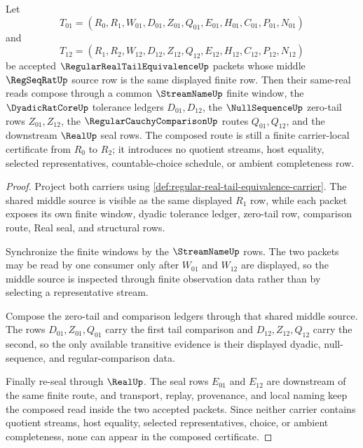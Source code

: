 \begin{theorem}
\label{thm:regular-real-tail-equivalence-transitive-window}
Let
$$
T_{01}=(R_0,R_1,W_{01},D_{01},Z_{01},Q_{01},E_{01},H_{01},C_{01},P_{01},N_{01})
$$
and
$$
T_{12}=(R_1,R_2,W_{12},D_{12},Z_{12},Q_{12},E_{12},H_{12},C_{12},P_{12},N_{12})
$$
be accepted $\RegularRealTailEquivalenceUp$ packets whose middle $\RegSeqRatUp$ source row is the same displayed finite row. Then their same-real reads compose through a common $\StreamNameUp$ finite window, the $\DyadicRatCoreUp$ tolerance ledgers $D_{01},D_{12}$, the $\NullSequenceUp$ zero-tail rows $Z_{01},Z_{12}$, the $\RegularCauchyComparisonUp$ routes $Q_{01},Q_{12}$, and the downstream $\RealUp$ seal rows. The composed route is still a finite carrier-local certificate from $R_0$ to $R_2$; it introduces no quotient streams, host equality, selected representatives, countable-choice schedule, or ambient completeness row.
\end{theorem}
\begin{proof}
Project both carriers using \autoref{def:regular-real-tail-equivalence-carrier}. The shared middle source is visible as the same displayed $R_1$ row, while each packet exposes its own finite window, dyadic tolerance ledger, zero-tail row, comparison route, Real seal, and structural rows.

Synchronize the finite windows by the $\StreamNameUp$ rows. The two packets may be read by one consumer only after $W_{01}$ and $W_{12}$ are displayed, so the middle source is inspected through finite observation data rather than by selecting a representative stream.

Compose the zero-tail and comparison ledgers through that shared middle source. The rows $D_{01},Z_{01},Q_{01}$ carry the first tail comparison and $D_{12},Z_{12},Q_{12}$ carry the second, so the only available transitive evidence is their displayed dyadic, null-sequence, and regular-comparison data.

Finally re-seal through $\RealUp$. The seal rows $E_{01}$ and $E_{12}$ are downstream of the same finite route, and transport, replay, provenance, and local naming keep the composed read inside the two accepted packets. Since neither carrier contains quotient streams, host equality, selected representatives, choice, or ambient completeness, none can appear in the composed certificate.
\end{proof}

